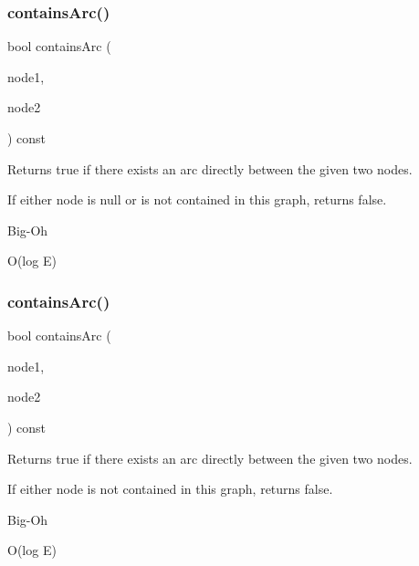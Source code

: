 \subsubsection{\texorpdfstring{contains\+Arc()}{containsArc()}\hspace{0.1cm}{\footnotesize\ttfamily [1/3]}}
{\footnotesize\ttfamily bool contains\+Arc (\begin{DoxyParamCaption}\item[{Node\+Type $\ast$}]{node1,  }\item[{Node\+Type $\ast$}]{node2 }\end{DoxyParamCaption}) const}



Returns true if there exists an arc directly between the given two nodes. 

If either node is null or is not contained in this graph, returns false. \begin{DoxyRefDesc}{Big-\/\+Oh}
\item[\mbox{\hyperlink{BigOh__BigOh000053}{Big-\/\+Oh}}]O(log E) \end{DoxyRefDesc}
\mbox{\label{classGraph_a515e45aae316b581bf1cf168541f4f44}} 
\subsubsection{\texorpdfstring{contains\+Arc()}{containsArc()}\hspace{0.1cm}{\footnotesize\ttfamily [2/3]}}
{\footnotesize\ttfamily bool contains\+Arc (\begin{DoxyParamCaption}\item[{const std\+::string \&}]{node1,  }\item[{const std\+::string \&}]{node2 }\end{DoxyParamCaption}) const}



Returns true if there exists an arc directly between the given two nodes. 

If either node is not contained in this graph, returns false. \begin{DoxyRefDesc}{Big-\/\+Oh}
\item[\mbox{\hyperlink{BigOh__BigOh000054}{Big-\/\+Oh}}]O(log E) \end{DoxyRefDesc}
\mbox{\label{classGraph_acf7a659ddd8a143836b91b01c200ee8a}} 
